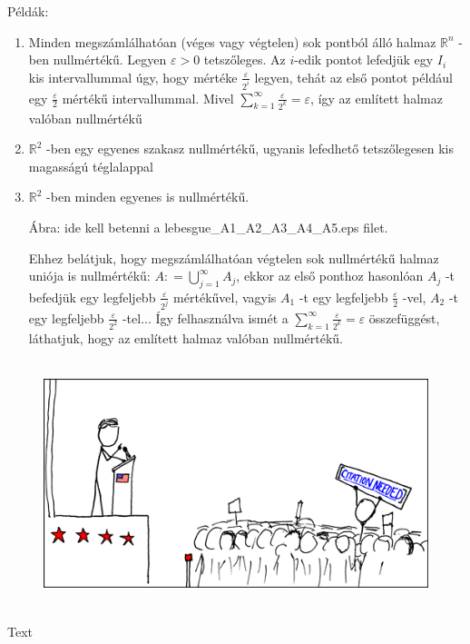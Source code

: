 \documentclass[12pt,a4paper]{scrartcl}
\providecommand{\tightlist}{%
  \setlength{\itemsep}{0pt}\setlength{\parskip}{0pt}}
\newenvironment{pelda}{}{}
\newenvironment{ajanlofig}{\begin{figure}\begin{center}}{
\end{center}\end{figure}}
\begin{document}
\begin{pelda}

Példák:

\begin{enumerate}
\def\labelenumi{\arabic{enumi}.}
\tightlist
\item
  Minden megszámlálhatóan (véges vagy végtelen) sok pontból álló halmaz
  \({\mathbb{R}}^{n}\) -ben nullmértékű. Legyen \(\varepsilon > 0\)
  tetszőleges. Az \(i\)-edik pontot lefedjük egy \(I_{i}\) kis
  intervallummal úgy, hogy mértéke \(\frac{\varepsilon}{2^{i}}\) legyen,
  tehát az első pontot például egy \(\frac{\varepsilon}{2}\) mértékű
  intervallummal. Mivel
  \(\sum\limits_{k = 1}^{\infty}{\frac{\varepsilon}{2^{k}} = \varepsilon}\),
  így az említett halmaz valóban nullmértékű
\item
  \({\mathbb{R}}^{2}\) -ben egy egyenes szakasz nullmértékű, ugyanis
  lefedhető tetszőlegesen kis magasságú téglalappal
\item
  \({\mathbb{R}}^{2}\) -ben minden egyenes is nullmértékű.

  Ábra: ide kell betenni a lebesgue\_A1\_A2\_A3\_A4\_A5.eps filet.

  Ehhez belátjuk, hogy megszámlálhatóan végtelen sok nullmértékű halmaz
  uniója is nullmértékű:
  \(A: = {\bigcup\limits_{j = 1}^{\infty}A_{j}}\), ekkor az első ponthoz
  hasonlóan \(A_{j}\) -t befedjük egy legfeljebb
  \(\frac{\varepsilon}{2^{j}}\) mértékűvel, vagyis \(A_{1}\) -t egy
  legfeljebb \(\frac{\varepsilon}{2}\) -vel, \(A_{2}\) -t egy legfeljebb
  \(\frac{\varepsilon}{2^{2}}\) -tel... Így felhasználva ismét a
  \(\sum\limits_{k = 1}^{\infty}{\frac{\varepsilon}{2^{k}} = \varepsilon}\)
  összefüggést, láthatjuk, hogy az említett halmaz valóban nullmértékű.
\end{enumerate}

\end{pelda}

\begin{ajanlo}

\begin{ajanlofig}

\href{https://xkcd.com}{\includegraphics[width=5.20833in,height=2.82292in]{wikipedian_protester.png}}

\end{ajanlofig}

Text

\end{ajanlo}
\end{document}
